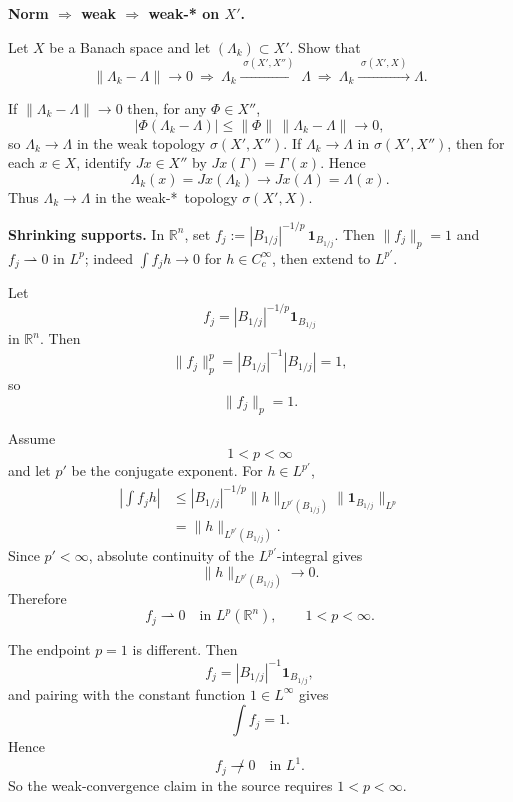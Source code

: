 \begin{problem}[CP-II-0449]
\label{prob:cp-ii-0449}
\textbf{Norm $\Rightarrow$ weak $\Rightarrow$ weak-* on $X'$.}

\hspace*{1.5em}Let $X$ be a Banach space and let $(\Lambda_k)\subset X'$. Show that
	\[
	\|\Lambda_k-\Lambda\|\to0 \ \Longrightarrow\ \Lambda_k \xrightarrow{\;\sigma(X',X'')\;} \Lambda
	\ \Longrightarrow\ \Lambda_k \xrightarrow{\;\sigma(X',X)\;} \Lambda .
	\]
\end{problem}

\begin{solution}
If $\|\Lambda_k-\Lambda\|\to0$ then, for any $\Phi\in X''$,
	\[
	|\Phi(\Lambda_k-\Lambda)| \le \|\Phi\|\,\|\Lambda_k-\Lambda\| \to 0,
	\]
	so $\Lambda_k\to\Lambda$ in the weak topology $\sigma(X',X'')$.
	If $\Lambda_k\to\Lambda$ in $\sigma(X',X'')$, then for each $x\in X$,
	identify $Jx\in X''$ by $Jx(\Gamma)=\Gamma(x)$. Hence
	\[
	\Lambda_k(x)=Jx(\Lambda_k) \longrightarrow Jx(\Lambda)=\Lambda(x).
	\]
	Thus $\Lambda_k\to\Lambda$ in the weak-*\ topology $\sigma(X',X)$.
\end{solution}

\begin{problem}[CP-II-0450]
\label{prob:cp-ii-0450}
\textbf{Shrinking supports.}
		In $\mathbb R^{n}$, set $f_j := |B_{1/j}|^{-1/p}\,\mathbf 1_{B_{1/j}}$. Then $\|f_j\|_p=1$ and
		$f_j\rightharpoonup 0$ in $L^{p}$; indeed $\int f_j h \to 0$ for $h\in C_c^\infty$, then extend to $L^{p'}$.
\end{problem}

\begin{solution}
Let
\[
f_j
=
|B_{1/j}|^{-1/p}\mathbf1_{B_{1/j}}
\]
in \(\mathbb R^n\). Then
\[
\|f_j\|_p^p
=
|B_{1/j}|^{-1}
|B_{1/j}|
=
1,
\]
so
\[
\boxed{\|f_j\|_p=1.}
\]

Assume
\[
1<p<\infty
\]
and let \(p'\) be the conjugate exponent. For \(h\in L^{p'}\),
\[
\begin{aligned}
\left|
\int f_jh
\right|
&\le
|B_{1/j}|^{-1/p}
\|h\|_{L^{p'}(B_{1/j})}
\|\mathbf1_{B_{1/j}}\|_{L^p}\\
&=
\|h\|_{L^{p'}(B_{1/j})}.
\end{aligned}
\]
Since \(p'<\infty\), absolute continuity of the \(L^{p'}\)-integral gives
\[
\|h\|_{L^{p'}(B_{1/j})}\to0.
\]
Therefore
\[
\boxed{
f_j\rightharpoonup0
\quad\text{in }L^p(\mathbb R^n),
\qquad
1<p<\infty.
}
\]

The endpoint \(p=1\) is different. Then
\[
f_j=|B_{1/j}|^{-1}\mathbf1_{B_{1/j}},
\]
and pairing with the constant function \(1\in L^\infty\) gives
\[
\int f_j=1.
\]
Hence
\[
\boxed{
f_j\not\rightharpoonup0
\quad\text{in }L^1.
}
\]
So the weak-convergence claim in the source requires \(1<p<\infty\).
\end{solution}


